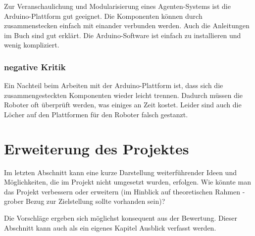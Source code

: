 Zur Veranschaulichung und Modularisierung eines Agenten-Systems ist die Arduino-Plattform gut geeignet. Die Komponenten können durch zusammenstecken einfach mit einander verbunden werden. Auch die Anleitungen im Buch sind gut erklärt. Die Arduino-Software ist einfach zu installieren und wenig kompliziert. 

\subsubsection{negative Kritik}

Ein Nachteil beim Arbeiten mit der Arduino-Plattform ist, dass sich die zusammengesteckten Komponenten wieder leicht trennen. Dadurch müssen die Roboter oft überprüft werden, was einiges an Zeit kostet. Leider sind auch die Löcher auf den Plattformen für den Roboter falsch gestanzt. 

\section{Erweiterung des Projektes}

Im letzten Abschnitt kann eine kurze Darstellung weiterführender Ideen und Möglichkeiten, die im Projekt nicht umgesetzt wurden, erfolgen. Wie könnte man das Projekt verbessern oder erweitern (im Hinblick auf theoretischen Rahmen - grober Bezug zur Zielstellung sollte vorhanden sein)? 

Die Vorschläge ergeben sich möglichst konsequent aus der Bewertung. 
Dieser Abschnitt kann auch als ein eigenes Kapitel Ausblick verfasst werden.